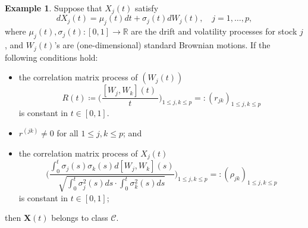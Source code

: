 \documentclass[a4paper,11pt]{book}
\theoremstyle{plain}
\theoremstyle{definition}
\newtheorem{exmp}[thm]{Example}
\newcommand{\MR}{\mathbb{R}}
\begin{document}
    \begin{exmp} \label{exmp C}
    	Suppose that $X_j(t)$ satisfy
    	\[ dX_j(t) = \mu_j(t) dt + \sigma_j(t) dW_j(t), \quad j = 1, \dots, p, \]
    	where $\mu_j(t), \sigma_j(t) : [0, 1] \rightarrow \MR$ are the drift and volatility processes for stock $j$, and $W_j(t)$'s are  (one-dimensional) standard Brownian motions. If the following conditions hold:
    	\begin{itemize}
    		\item the correlation matrix process of $(W_j(t))$
    		\[ R(t)\coloneqq \bigg(\frac{ [W_j, W_k](t) \ }{t}\bigg)_{1 \leq j,k \leq p} =:(r_{jk})_{1 \leq j,k \leq p} \]
    		is constant in $t \in [0, 1]$.
    		\item $r^{(jk)} \neq 0$ for all $1 \leq j,k \leq p$; and
    		\item the correlation matrix process of $X_j(t)$
    		\[ \Bigg( \frac{\int_{0}^{t} \sigma_j(s) \sigma_k(s)  d[W_j, W_k](s) }{\sqrt{\int_{0}^{t} \sigma_j^2(s) ds \cdot \int_{0}^{t} \sigma_k^2(s) ds}} \Bigg)_{1 \leq j,k \leq p}  =:(\rho_{jk})_{1 \leq j,k \leq p}  \]
    		is constant in $t \in [0, 1]$;
    	\end{itemize}
    	then $\mathbf{X}(t)$ belongs to class $\mathcal{C}$.
    	

\end{exmp}
\end{document}
